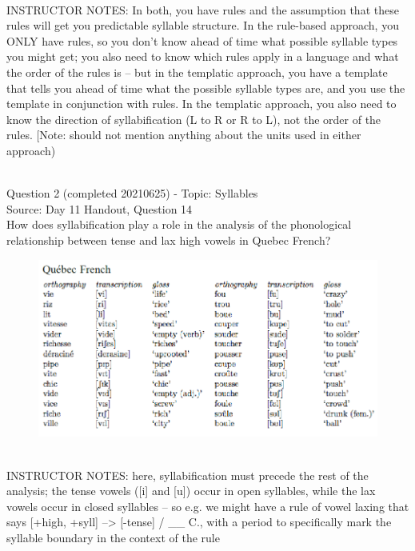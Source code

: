 \documentclass[12pt]{article}
\begin{document}
~\\
INSTRUCTOR NOTES: In both, you have rules and the assumption that these rules will get you predictable syllable structure. In the rule-based approach, you ONLY have rules, so you don't know ahead of time what possible syllable types you might get; you also need to know which rules apply in a language and what the order of the rules is -- but in the templatic approach, you have a template that tells you ahead of time what the possible syllable types are, and you use the template in conjunction with rules. In the templatic approach, you also need to know the direction of syllabification (L to R or R to L), not the order of the rules. [Note: should not mention anything about the units used in either approach)


~\\

{\large Question 2} (completed 20210625) - Topic: Syllables\\
Source: Day 11 Handout, Question 14\\

How does syllabification play a role in the analysis of the phonological relationship between tense and lax high vowels in Quebec French?\\

\begin{figure}[H]
\includegraphics{../images/quebecfrench.png}
\end{figure}

~\\
INSTRUCTOR NOTES: here, syllabification must precede the rest of the analysis; the tense vowels ([i] and [u]) occur in open syllables, while the lax vowels occur in closed syllables -- so e.g. we might have a rule of vowel laxing that says [+high, +syll] --> [-tense] / \_\_ C., with a period to specifically mark the syllable boundary in the context of the rule
\end{document}
